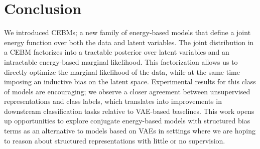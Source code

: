\documentclass{article}
\begin{document}
\section{Conclusion}
\label{sec:conclusion}

We introduced CEBMs; a new family of energy-based models that define a joint energy function over both the data and latent variables. The joint distribution in a CEBM factorizes into a tractable posterior over latent variables and an intractable energy-based marginal likelihood. This factorization allows us to directly optimize the marginal likelihood of the data, while at the same time imposing an inductive bias on the latent space. Experimental results for this class of models are encouraging; we observe 
a closer agreement between unsupervised representations and class labels, which translates into improvements in downstream classification tasks relative to VAE-based baselines. This work opens up opportunities to explore conjugate energy-based models with structured bias terms as an alternative to models based on VAEs in settings where we are hoping to reason about structured representations with little or no supervision. 







\appendix


\end{document}
